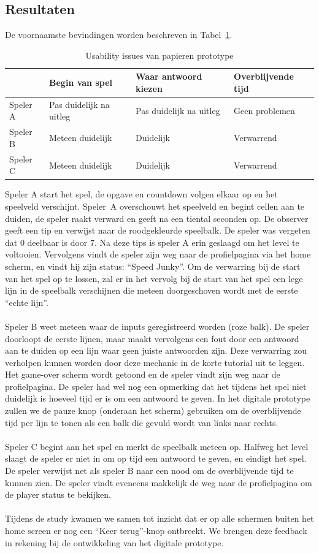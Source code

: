 \documentclass[11pt]{article}
\begin{document}
	\subsection{Resultaten}
De voornaamste bevindingen worden beschreven in Tabel~\ref{Issues-PP}.
    \begin{table}[H]
		\centering
		\begin{tabular}{|l l l l|}
        	\hline
			& \textbf{Begin van spel} & \textbf{Waar antwoord kiezen} & \textbf{Overblijvende tijd} \\
            \hline
			Speler A & Pas duidelijk na uitleg & Pas duidelijk na uitleg & Geen problemen\\
			Speler B & Meteen duidelijk & Duidelijk & Verwarrend\\
			Speler C & Meteen duidelijk & Duidelijk & Verwarrend\\
			\hline
		\end{tabular}
		\caption{Usability issues van papieren prototype}\label{Issues-PP}
    \end{table}
\noindent
Speler A start het spel, de opgave en countdown volgen elkaar op en het speelveld verschijnt. Speler~A overschouwt het speelveld en begint cellen aan te duiden, de speler raakt verward en geeft na een tiental seconden op. De observer geeft een tip en verwijst naar de roodgekleurde speelbalk. De speler was vergeten dat $0$ deelbaar is door $7$. Na deze tips is speler A erin geslaagd om het level te voltooien. Vervolgens vindt de speler zijn weg naar de profielpagina via het home scherm, en vindt hij zijn status: ``Speed Junky''. Om de verwarring bij de start van het spel op te lossen, zal er in het vervolg bij de start van het spel een lege lijn in de speelbalk verschijnen die meteen doorgeschoven wordt met de eerste ``echte lijn''.\\\\
Speler B weet meteen waar de inputs geregistreerd worden (roze balk). De speler doorloopt de eerste lijnen, maar maakt vervolgens een fout door een antwoord aan te duiden op een lijn waar geen juiste antwoorden zijn. Deze verwarring zou verholpen kunnen worden door deze mechanic in de korte tutorial uit te leggen. Het game-over scherm wordt getoond en de speler vindt zijn weg naar de profielpagina. De speler had wel nog een opmerking dat het tijdens het spel niet duidelijk is hoeveel tijd er is om een antwoord te geven. In het digitale prototype zullen we de pauze knop (onderaan het scherm) gebruiken om de overblijvende tijd per lijn te tonen als een balk die gevuld wordt van links naar rechts.\\\\
Speler C begint aan het spel en merkt de speelbalk meteen op. Halfweg het level slaagt de speler er niet in om op tijd een antwoord te geven, en eindigt het spel. De speler verwijst net als speler B naar een nood om de overblijvende tijd te kunnen zien. De speler vindt eveneens makkelijk de weg naar de profielpagina om de player status te bekijken.\\\\
Tijdens de study kwamen we samen tot inzicht dat er op alle schermen buiten het home screen er nog een ``Keer terug''-knop ontbreekt. We brengen deze feedback in rekening bij de ontwikkeling van het digitale prototype.
\end{document}
